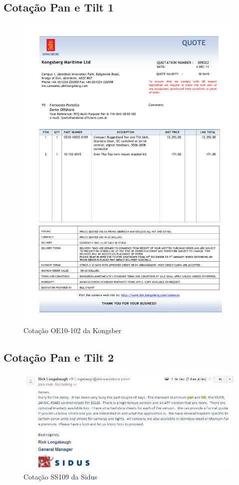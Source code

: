 \subsection{Cotação Pan e Tilt 1 }
\begin{figure}[H]
\centering
\includegraphics[width=1\columnwidth]{Pan_Tilt/price_quote_0.pdf}
\caption{Cotação OE10-102 da Kongsber  } 
\end{figure}

\subsection{Cotação Pan e Tilt 2 }
\begin{figure}[H]
 \centering
 \includegraphics[width=1\columnwidth]{Pan_Tilt/price_quote_1}
 \caption{Cotação SS109 da Sidus}
\end{figure}

